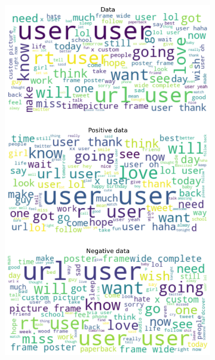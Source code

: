 \documentclass{article}
\begin{document}
\begin{itemize}
\begin{figure}[H]
\begin{subfigure}[b]{0.24\textwidth}
      \includegraphics[width=\textwidth]{chapter-06/section-01-01/04/visualization/2/wordcloud.png}
    \end{subfigure}
    \begin{subfigure}[b]{0.24\textwidth}
      \centering

\end{subfigure}
\end{figure}
\end{itemize}
\end{document}
